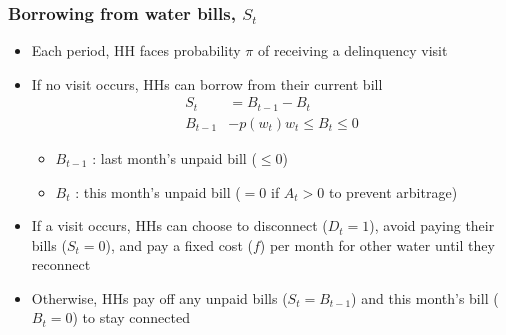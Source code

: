 \documentclass[aspectratio=149]{beamer}
\begin{document}
\begin{frame}
\frametitle{Borrowing from water bills, $S_t$}



\begin{itemize}
\item Each period, HH faces probability $\pi$ of receiving a delinquency visit
\item If no visit occurs, HHs can borrow from their current bill
\begin{align*}
S_t &= B_{t-1} -  B_{t} \\
B_{t-1} &-  p(w_t) w_t \leq B_{t} \leq 0 
\end{align*}

\begin{itemize}
  \item $B_{t-1}$ : last month's unpaid bill { \footnotesize ($\leq0$) }
  \item $B_{t}$ : this month's unpaid bill { \footnotesize ($=0$ if $A_t>0$ to prevent arbitrage)}
\end{itemize}
\vspace{2mm}


\item If a visit occurs, HHs can choose to disconnect ($D_{t}=1$), avoid paying their bills ($S_t  = 0$), and pay a fixed cost ($f$) per month for other water until they reconnect

\item Otherwise, HHs pay off any unpaid bills ($S_t=B_{t-1}$) and this month's bill ($B_{t}=0$) to stay connected

\end{itemize}

\end{frame}


\end{document}
